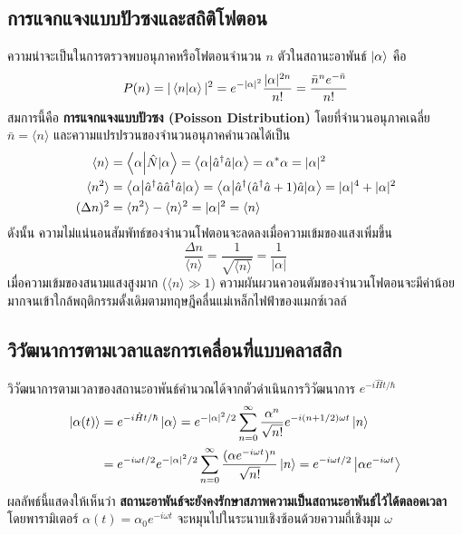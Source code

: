 \subsection{การแจกแจงแบบปัวซงและสถิติโฟตอน}
ความน่าจะเป็นในการตรวจพบอนุภาคหรือโฟตอนจำนวน $n$ ตัวในสถานะอาพันธ์ $\ket{\alpha}$ คือ
\begin{equation}
P(n) = |\braket{n}{\alpha}|^2 = e^{-|\alpha|^2} \frac{|\alpha|^{2n}}{n!} = \frac{\bar{n}^n e^{-\bar{n}}}{n!} \label{eq_poisson_photon_dist}
\end{equation}
สมการนี้คือ \textbf{การแจกแจงแบบปัวซง (Poisson Distribution)} โดยที่จำนวนอนุภาคเฉลี่ย $\bar{n} = \langle n \rangle$ และความแปรปรวนของจำนวนอนุภาคคำนวณได้เป็น
\begin{align}
\langle n \rangle &= \braket{\alpha}{\hat{N}|\alpha} = \braket{\alpha}{\hat{a}^\dagger\hat{a}|\alpha} = \alpha^* \alpha = |\alpha|^2 \\
\langle n^2 \rangle &= \braket{\alpha}{\hat{a}^\dagger\hat{a}\hat{a}^\dagger\hat{a}|\alpha} = \braket{\alpha}{\hat{a}^\dagger(\hat{a}^\dagger\hat{a} + 1)\hat{a}|\alpha} = |\alpha|^4 + |\alpha|^2 \\
(\Delta n)^2 &= \langle n^2 \rangle - \langle n \rangle^2 = |\alpha|^2 = \langle n \rangle
\end{align}
ดังนั้น ความไม่แน่นอนสัมพัทธ์ของจำนวนโฟตอนจะลดลงเมื่อความเข้มของแสงเพิ่มขึ้น
\begin{equation}
\frac{\Delta n}{\langle n \rangle} = \frac{1}{\sqrt{\langle n \rangle}} = \frac{1}{|\alpha|}
\end{equation}
เมื่อความเข้มของสนามแสงสูงมาก ($\langle n \rangle \gg 1$) ความผันผวนควอนตัมของจำนวนโฟตอนจะมีค่าน้อยมากจนเข้าใกล้พฤติกรรมดั้งเดิมตามทฤษฎีคลื่นแม่เหล็กไฟฟ้าของแมกซ์เวลล์

\subsection{วิวัฒนาการตามเวลาและการเคลื่อนที่แบบคลาสสิก}
วิวัฒนาการตามเวลาของสถานะอาพันธ์คำนวณได้จากตัวดำเนินการวิวัฒนาการ $e^{-i\hat{H}t/\hbar}$
\begin{align}
\ket{\alpha(t)} &= e^{-i\hat{H}t/\hbar}\ket{\alpha} = e^{-|\alpha|^2/2} \sum_{n=0}^\infty \frac{\alpha^n}{\sqrt{n!}} e^{-i(n + 1/2)\omega t}\ket{n} \nonumber \\
&= e^{-i\omega t/2} e^{-|\alpha|^2/2} \sum_{n=0}^\infty \frac{(\alpha e^{-i\omega t})^n}{\sqrt{n!}}\ket{n} = e^{-i\omega t/2} \ket{\alpha e^{-i\omega t}}
\end{align}
ผลลัพธ์นี้แสดงให้เห็นว่า \textbf{สถานะอาพันธ์จะยังคงรักษาสภาพความเป็นสถานะอาพันธ์ไว้ได้ตลอดเวลา} โดยพารามิเตอร์ $\alpha(t) = \alpha_0 e^{-i\omega t}$ จะหมุนไปในระนาบเชิงซ้อนด้วยความถี่เชิงมุม $\omega$

